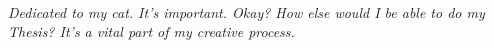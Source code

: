 \tableofcontents



\newpage\thispagestyle{empty}
~\vfill
\begin{doublespace}
\noindent\fontsize{18}{22}\selectfont\itshape
\nohyphenation
Dedicated to my cat. It's important. Okay? How else would I be able to do my Thesis? It's a vital part of my creative process.
\end{doublespace}
\vfill
\vfill